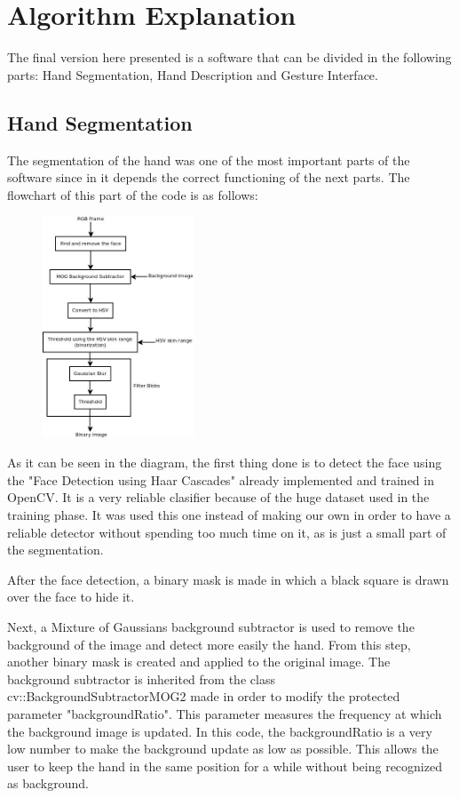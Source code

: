 \section{Algorithm Explanation}

The final version here presented is a software that can be divided in the following parts: Hand Segmentation, Hand Description and Gesture Interface.

\subsection{Hand Segmentation}
The segmentation of the hand was one of the most important parts of the software since in it depends the correct functioning of the next parts. 
The flowchart of this part of the code is as follows: 

\begin{figure}[H]
	\centering
	 \includegraphics[width=0.4\textwidth]{../hand_filter.jpeg} 
\end{figure}
 
As it can be seen in the diagram, the first thing done is to detect the face using the "Face Detection using Haar Cascades" already implemented and trained in OpenCV. It is a very reliable clasifier because of the huge dataset used in the training phase. It was used this one instead of making our own in order to have a reliable detector without spending too much time on it, as is just a small part of the segmentation. 


After the face detection, a binary mask is made in which a black square is drawn over the face to hide it.

Next, a Mixture of Gaussians background subtractor is used to remove the background of the image and detect more easily the hand. From this step, another binary mask is created and applied to the original image. 
The background subtractor is inherited from the class cv::BackgroundSubtractorMOG2 made in order to modify the protected parameter "backgroundRatio". This parameter measures the frequency at which the background image is updated. In this code, the backgroundRatio is a very low number to make the background update as low as possible. This allows the user to keep the hand in the same position for a while without being recognized as background.  

